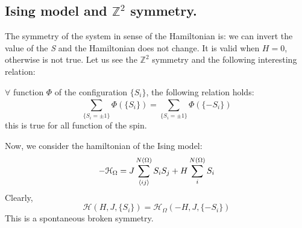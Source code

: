 \documentclass[../main/main.tex]{subfiles}
\begin{document}
\subsection{Ising model and \( \mathbb{Z}^2 \) symmetry. }
The symmetry of the system in sense of the Hamiltonian is: we can invert the value of the \emph{S} and the Hamiltonian does not change. It is valid when \( H=0 \), otherwise is not true. Let us see the \( \mathbb{Z}^2 \) symmetry and the following interesting relation:

  \begin{lemma}{}{}
  \( \forall  \) function \( \Phi  \) of the configuration \( \{ S_i \}   \), the following relation holds:
  \begin{equation}
    \sum_{ \{S_i = \pm 1\}}^{}  \Phi  (\{S_i\} ) =   \sum_{ \{S_i = \pm 1\}}^{}  \Phi  (\{-S_i\} )
      \label{eq:6_1}
  \end{equation}
  this is true for all function of the spin.
  \end{lemma}

Now, we consider the hamiltonian of the Ising model:
\begin{equation*}
  - \mathcal{H}_ \Omega  = J \sum_{\expval{ij} }^{N(\Omega )} S_i S_j + H \sum_{i}^{N(\Omega )} S_i
\end{equation*}
Clearly,
\begin{equation}
  \mathcal{H}(H,J, \{S_i\}) =   \mathcal{H}_ \Omega (-H,J, \{-S_i\})
  \label{eq:6_1_1}
\end{equation}
This is a spontaneous broken symmetry.
\end{document}
